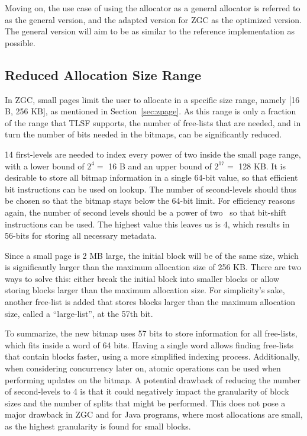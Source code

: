 Moving on, the use case of using the allocator as a general allocator is referred to as the general version, and the adapted version for ZGC as the optimized version. The general version will aim to be as similar to the reference implementation as possible.

\subsection{Reduced Allocation Size Range}
\label{sec:adaptations:reduced_allocation_range}

In ZGC, small pages limit the user to allocate in a specific size range, namely [16 B, 256 KB], as mentioned in Section~\ref{sec:zpage}. As this range is only a fraction of the range that TLSF supports, the number of free-lists that are needed, and in turn the number of bits needed in the bitmaps, can be significantly reduced.

14 first-levels are needed to index every power of two inside the small page range, with a lower bound of $2^4 =$ 16 B and an upper bound of $2^{17} =$ 128 KB. It is desirable to store all bitmap information in a single 64-bit value, so that efficient bit instructions can be used on lookup. The number of second-levels should thus be chosen so that the bitmap stays below the 64-bit limit. For efficiency reasons again, the number of second levels should be a power of two~\cite{TLSF} so that bit-shift instructions can be used. The highest value this leaves us is 4, which results in 56-bits for storing all necessary metadata.

Since a small page is 2 MB large, the initial block will be of the same size, which is significantly larger than the maximum allocation size of 256 KB. There are two ways to solve this: either break the initial block into smaller blocks or allow storing blocks larger than the maximum allocation size. For simplicity's sake, another free-list is added that stores blocks larger than the maximum allocation size, called a ``large-list'', at the 57th bit.

\newpage

To summarize, the new bitmap uses 57 bits to store information for all free-lists, which fits inside a word of 64 bits. Having a single word allows finding free-lists that contain blocks faster, using a more simplified indexing process. Additionally, when considering concurrency later on, atomic operations can be used when performing updates on the bitmap. A potential drawback of reducing the number of second-levels to 4 is that it could negatively impact the granularity of block sizes and the number of splits that might be performed. This does not pose a major drawback in ZGC and for Java programs, where most allocations are small, as the highest granularity is found for small blocks.

